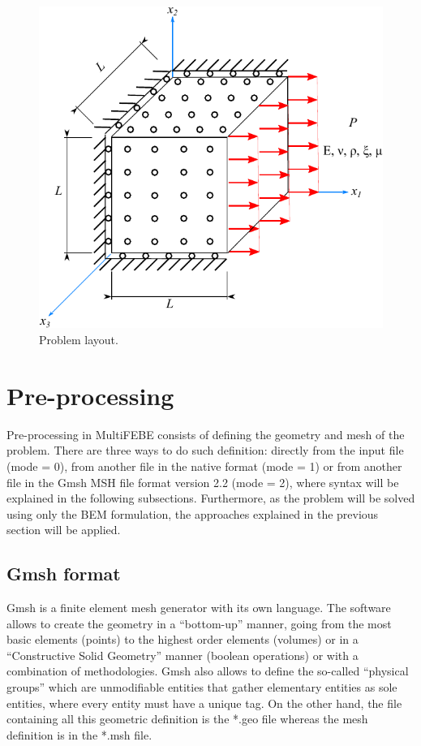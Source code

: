 \documentclass[a4]{article}
\begin{document}
\begin{figure}[h]
	\centering
	\includegraphics{cube.pdf}
	\caption{Problem layout.}
	\label{fig:cube}
\end{figure}

\section{Pre-processing} 
Pre-processing in MultiFEBE consists of defining the geometry and mesh of the problem. There are three ways to do such definition: directly from the input file (mode = 0), from another file in the native format (mode = 1) or from another file in the Gmsh MSH file format version 2.2 (mode = 2), where syntax will be explained in the following subsections. Furthermore, as the problem will be solved using only the BEM formulation, the approaches explained in the previous section will be applied.      

\subsection{Gmsh format}
Gmsh \cite{gmsh, gmshweb} is a finite element mesh generator with its own language. The software allows to create the geometry in a “bottom-up” manner, going from the most basic elements (points) to the highest order elements (volumes) or in a “Constructive Solid Geometry” manner (boolean operations) or with a combination of methodologies. Gmsh also allows to define  the so-called “physical groups” which are unmodifiable entities that gather elementary entities as sole entities, where every entity must have a unique tag. On the other hand, the file containing all this geometric definition is the *.geo file whereas the mesh definition is in the *.msh file. 
\end{document}
